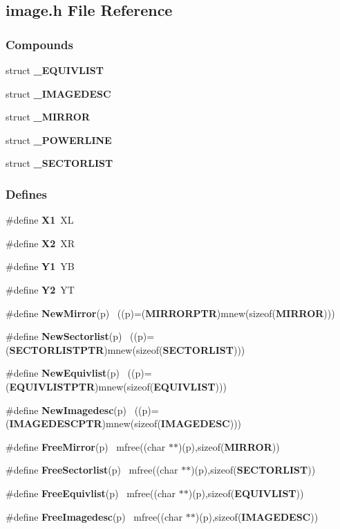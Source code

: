 \subsection{image.h File Reference}
\label{image.h}
\subsubsection*{Compounds}
\begin{CompactItemize}
\item 
struct {\bf \_\-EQUIVLIST}
\item 
struct {\bf \_\-IMAGEDESC}
\item 
struct {\bf \_\-MIRROR}
\item 
struct {\bf \_\-POWERLINE}
\item 
struct {\bf \_\-SECTORLIST}
\end{CompactItemize}
\subsubsection*{Defines}
\begin{CompactItemize}
\item 
\#define {\bf X1}\ XL
\item 
\#define {\bf X2}\ XR
\item 
\#define {\bf Y1}\ YB
\item 
\#define {\bf Y2}\ YT
\item 
\#define {\bf New\-Mirror}(p) \ ((p)=({\bf MIRRORPTR})mnew(sizeof({\bf MIRROR})))
\item 
\#define {\bf New\-Sectorlist}(p) \ ((p)=({\bf SECTORLISTPTR})mnew(sizeof({\bf SECTORLIST})))
\item 
\#define {\bf New\-Equivlist}(p) \ ((p)=({\bf EQUIVLISTPTR})mnew(sizeof({\bf EQUIVLIST})))
\item 
\#define {\bf New\-Imagedesc}(p) \ ((p)=({\bf IMAGEDESCPTR})mnew(sizeof({\bf IMAGEDESC})))
\item 
\#define {\bf Free\-Mirror}(p) \ mfree((char $\ast$$\ast$)(p),sizeof({\bf MIRROR}))
\item 
\#define {\bf Free\-Sectorlist}(p) \ mfree((char $\ast$$\ast$)(p),sizeof({\bf SECTORLIST}))
\item 
\#define {\bf Free\-Equivlist}(p) \ mfree((char $\ast$$\ast$)(p),sizeof({\bf EQUIVLIST}))
\item 
\#define {\bf Free\-Imagedesc}(p) \ mfree((char $\ast$$\ast$)(p),sizeof({\bf IMAGEDESC}))
\end{CompactItemize}
